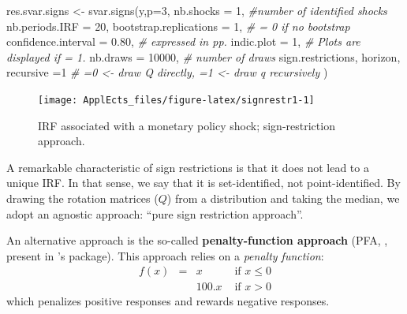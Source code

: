 \documentclass[
  12pt,
]{book}
\newenvironment{Shaded}{\begin{snugshade}}{\end{snugshade}}
\newcommand{\AttributeTok}[1]{\textcolor[rgb]{0.77,0.63,0.00}{#1}}
\newcommand{\CommentTok}[1]{\textcolor[rgb]{0.56,0.35,0.01}{\textit{#1}}}
\newcommand{\DecValTok}[1]{\textcolor[rgb]{0.00,0.00,0.81}{#1}}
\newcommand{\FloatTok}[1]{\textcolor[rgb]{0.00,0.00,0.81}{#1}}
\newcommand{\FunctionTok}[1]{\textcolor[rgb]{0.00,0.00,0.00}{#1}}
\newcommand{\NormalTok}[1]{#1}
\newcommand{\OtherTok}[1]{\textcolor[rgb]{0.56,0.35,0.01}{#1}}
\newcommand{\SpecialCharTok}[1]{\textcolor[rgb]{0.00,0.00,0.00}{#1}}
\theoremstyle{definition}
\theoremstyle{definition}
\theoremstyle{definition}
\theoremstyle{definition}
\theoremstyle{remark}
\begin{document}
\begin{Shaded}
\begin{Highlighting}[]
\NormalTok{res.svar.signs }\OtherTok{\textless{}{-}} \FunctionTok{svar.signs}\NormalTok{(y,}\AttributeTok{p=}\DecValTok{3}\NormalTok{,}
                             \AttributeTok{nb.shocks =} \DecValTok{1}\NormalTok{, }\CommentTok{\#number of identified shocks}
                             \AttributeTok{nb.periods.IRF =} \DecValTok{20}\NormalTok{,}
                             \AttributeTok{bootstrap.replications =} \DecValTok{1}\NormalTok{, }\CommentTok{\# = 0 if no bootstrap}
                             \AttributeTok{confidence.interval =} \FloatTok{0.80}\NormalTok{, }\CommentTok{\# expressed in pp.}
                             \AttributeTok{indic.plot =} \DecValTok{1}\NormalTok{, }\CommentTok{\# Plots are displayed if = 1.}
                             \AttributeTok{nb.draws =} \DecValTok{10000}\NormalTok{, }\CommentTok{\# number of draws}
\NormalTok{                             sign.restrictions,}
\NormalTok{                             horizon,}
                             \AttributeTok{recursive =}\DecValTok{1} \CommentTok{\#  =0 \textless{}{-} draw Q directly, =1 \textless{}{-} draw q recursively}
\NormalTok{)}
\end{Highlighting}
\end{Shaded}

\begin{figure}
\texttt{[image: ApplEcts\_files/figure-latex/signrestr1-1]} \caption{IRF associated with a monetary policy shock; sign-restriction approach.}\label{fig:signrestr1}
\end{figure}

\begin{Shaded}
\end{Shaded}

A remarkable characteristic of sign restrictions is that it does not lead to a unique IRF. In that sense, we say that it is set-identified, not point-identified. By drawing the rotation matrices (\(Q\)) from a distribution and taking the median, we adopt an agnostic approach: ``pure sign restriction approach''.

An alternative approach is the so-called \textbf{penalty-function approach} (PFA, \citet{Uhlig_2005}, present in \citet{Danne_2015}'s package). This approach relies on a \emph{penalty function}:
\[
\begin{array}{llll}f(x)&=&x&\text{ if }x\le0\\
&&100.x&\text{ if }x>0\end{array}
\]
which penalizes positive responses and rewards negative responses.
\end{document}
